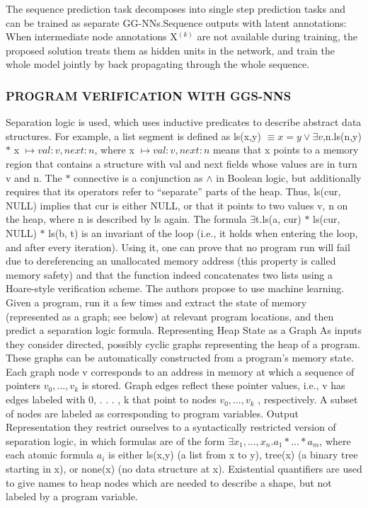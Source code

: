 \documentclass{article}
\begin{document}
The sequence prediction task decomposes into single step prediction tasks and can be trained as separate GG-NNs.Sequence outputs with latent annotations: When intermediate node annotations X$^{(k)}$ are not available during training, the proposed solution treats them as hidden units in the network, and train the whole model jointly by back propagating through the whole sequence.
\subsubsection{PROGRAM VERIFICATION WITH GGS-NNS}
Separation logic is used, which uses inductive predicates to describe abstract data structures. For example, a list segment is defined as ls(x,y) $\equiv x = y \lor \exists v$,n.ls(n,y) $\ast$ x $\mapsto {val : v,next : n}$, where x $\mapsto {val : v,next : n}$ means that x points to a memory region that contains a structure with val and next fields whose values are in turn v and n. The $\ast$ connective is a conjunction as $\wedge$ in Boolean logic, but additionally requires that its operators refer to “separate” parts of the heap. Thus, ls(cur, NULL) implies that cur is either NULL, or that it points to two values v, n on the heap, where n is described by ls again. The formula $\exists$t.ls(a, cur) $\ast$ ls(cur, NULL) $\ast$ ls(b, t) is an invariant of the loop (i.e., it holds when entering the loop, and after every iteration). Using it, one can prove that no program run will fail due to dereferencing an unallocated memory address (this property is called memory safety) and that the function indeed concatenates two lists using a Hoare-style verification scheme. The authors propose to use machine learning. Given a program, run it a few times and extract the state of memory (represented as a graph; see below) at relevant program locations, and then predict a separation logic formula. Representing Heap State as a Graph As inputs they consider directed, possibly cyclic graphs representing the heap of a program. These graphs can be automatically constructed from a program’s memory state. Each graph node v corresponds to an address in memory at which a sequence of pointers $v_0 , . . . , v_k$ is stored. Graph edges reflect these pointer values, i.e., v has edges labeled with 0, . . . , k that point to nodes $v_0 , . . . , v_k$ , respectively. A subset of nodes are labeled as corresponding to program variables. Output Representation they restrict ourselves to a syntactically restricted version of separation logic, in which formulas are of the form $\exists x_1,...,x_n.a_1 \ast...\ast a_m$, where each atomic formula $a_i$ is either ls(x,y) (a list from x to y), tree(x) (a binary tree starting in x), or none(x) (no data structure at x). Existential quantifiers are used to give names to heap nodes which are needed to describe a shape, but not labeled by a program variable. 
\end{document}
